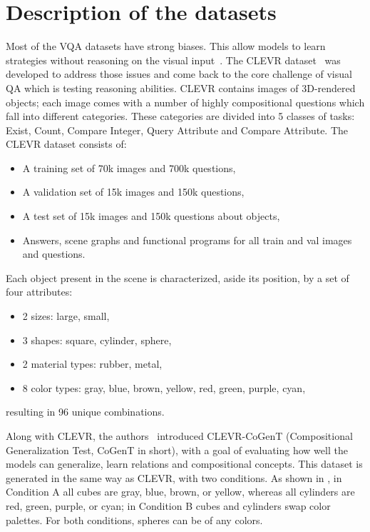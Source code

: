 \appendix

\section{Description of the datasets}

Most of the VQA datasets have strong biases. This allow models to learn strategies without reasoning on the visual input~\cite{Santoro2017ASN}.
The CLEVR dataset~\cite{johnson2017clevr} was developed to address those issues and come back to the core challenge of visual QA which is testing reasoning abilities.
CLEVR contains images of 3D-rendered objects; each image comes with a number of highly compositional questions which fall into different categories.
These categories are divided into 5 classes of tasks: Exist, Count, Compare Integer, Query Attribute and Compare Attribute. 
The CLEVR dataset consists of:
\begin{itemize}
\item 	A training set of 70k images and 700k questions,
\item	A validation set of 15k images and 150k questions,
\item	A test  set of 15k images and 150k questions about objects,
\item	Answers, scene graphs and functional programs for all train and val images and questions.
\end{itemize}
Each object present in the scene is characterized, aside its position, by a set of four attributes:
\begin{itemize}
\item 2 sizes: large, small,
\item 3 shapes: square, cylinder, sphere,
\item 2 material types: rubber, metal,
\item 8 color types: gray, blue, brown, yellow, red, green, purple, cyan,
\end{itemize}
resulting in 96 unique combinations.

Along with CLEVR, the authors~\cite{johnson2017clevr} introduced  CLEVR-CoGenT (Compositional Generalization Test, CoGenT in short), with a goal of evaluating how well the models can generalize, learn relations and compositional concepts.
This dataset is generated in the same way as CLEVR, with two conditions.
As shown in , in Condition A all cubes are gray, blue, brown, or yellow, whereas all cylinders are red, green, purple, or cyan; in Condition B cubes and cylinders swap color palettes.
For both conditions, spheres can be of any colors.


